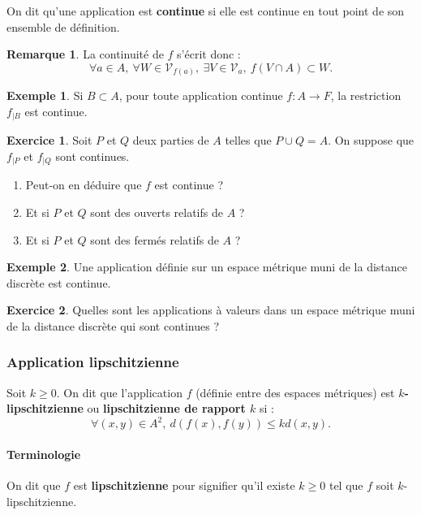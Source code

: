 \documentclass[french]{article}
\theoremstyle{plain}
\theoremstyle{definition}
\newtheorem*{ex}{Exemple}
\newtheorem{exo}{Exercice}
\newtheorem*{rmq}{Remarque}
\theoremstyle{remark}
\begin{document}
\begin{dfn}
	On dit qu'une application est \textbf{continue} si elle est continue en tout point de son ensemble de définition.
\end{dfn}

\begin{rmq}
	La continuité de $f$ s'écrit donc : $$\forall a\in A,\ \forall W\in\mathcal{V}_{f(a)},\ \exists V\in\mathcal{V}_a,\ f(V\cap A)\subset W.$$
\end{rmq}

\begin{ex}
	Si $B\subset A$, pour toute application continue $f:A\to F$, la restriction $f_{\mid B}$ est continue.
\end{ex}

\begin{exo}
	Soit $P$ et $Q$ deux parties de $A$ telles que $P\cup Q=A$. On suppose que $f_{\mid P}$ et $f_{\mid Q}$ sont continues.
	\begin{enumerate}
		\item Peut-on en déduire que $f$ est continue ?
		\item Et si $P$ et $Q$ sont des ouverts relatifs de $A$ ?
		\item Et si $P$ et $Q$ sont des fermés relatifs de $A$ ?
	\end{enumerate}
\end{exo}

\begin{ex}
	Une application définie sur un espace métrique muni de la distance discrète est continue.
\end{ex}

\begin{exo}
	Quelles sont les applications à valeurs dans un espace métrique muni de la distance discrète qui sont continues ?
\end{exo}

\subsubsection*{Application lipschitzienne}

\begin{dfn}
	Soit $k\geqslant0$. On dit que l'application $f$ (définie entre des espaces métriques) est \textbf{$k$-lipschitzienne} ou \textbf{lipschitzienne de rapport $k$} si : $$\forall (x,y)\in A^2,\ d(f(x),f(y))\leqslant k d(x,y).$$
\end{dfn}

\paragraph{Terminologie} On dit que $f$ est \textbf{lipschitzienne} pour signifier qu'il existe $k\geqslant 0$ tel que $f$ soit $k$-lipschitzienne.
\end{document}
